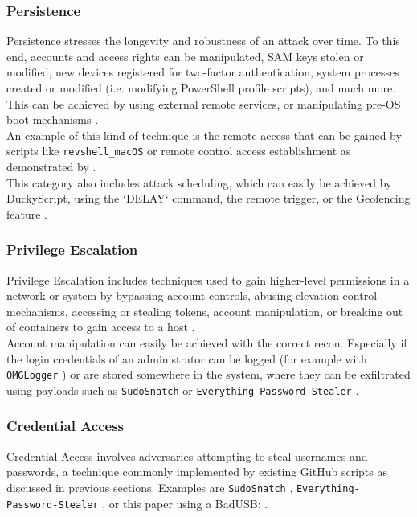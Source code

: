 \subsubsection{Persistence} \label{persistence}

Persistence stresses the longevity and robustness of an attack over time. To this end, accounts and access rights can be manipulated, SAM keys stolen or modified, new devices registered for two-factor authentication, system processes created or modified  (i.e. modifying PowerShell profile scripts), and much more. This can be achieved by using external remote services, or manipulating pre-OS boot mechanisms \cite{MITREATTCK}. \\
An example of this kind of technique is the remote access that can be gained by scripts like \verb|revshell_macOS| \cite{OmgpayloadsPayloadsLibrary}
or remote control access establishment as demonstrated by \cite{bojovicRisingThreatHardware2019}. \\
This category also includes attack scheduling, which can easily be achieved by DuckyScript, using the `DELAY` command, the remote trigger, or the Geofencing feature \cite{hak5MGCable}.

\subsubsection{Privilege Escalation}

Privilege Escalation includes techniques used to gain higher-level permissions in a network or system by bypassing account controls, abusing elevation control mechanisms, accessing or stealing tokens, account manipulation, or breaking out of containers to gain access to a host \cite{MITREATTCK}. \\
Account manipulation can easily be achieved with the correct recon. Especially if the login credentials of an administrator can be logged (for example with \verb|OMGLogger| \cite{OmgpayloadsPayloadsLibrary}) or are stored somewhere in the system, where they can be exfiltrated using payloads such as \verb|SudoSnatch| \cite{OmgpayloadsPayloadsLibrary} or \verb|Everything-Password-Stealer| \cite{OmgpayloadsPayloadsLibrary}.

\subsubsection{Credential Access}

Credential Access involves adversaries attempting to steal usernames and passwords, a technique commonly implemented by existing GitHub scripts as discussed in previous sections.
Examples are \verb|SudoSnatch| \cite{OmgpayloadsPayloadsLibrary}, \verb|Everything-Password-Stealer| \cite{OmgpayloadsPayloadsLibrary}, or this paper using a BadUSB:  \cite{muslimImplementationAnalysisUSB2020}.


